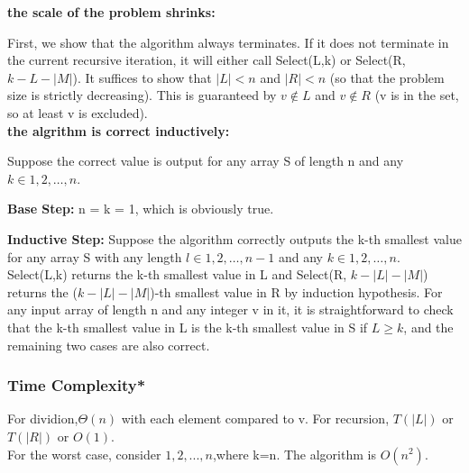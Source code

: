 \begin{prf}
\textbf{the scale of the problem shrinks:}

First, we show that the algorithm always terminates. If it does not terminate in the current recursive iteration, it will either call Select(L,k) or Select(R, $k - L - |M|$).
It suffices to show that $|L| < n$ and $|R| < n$ (so that the problem size is strictly
decreasing). This is guaranteed by $v \notin L$ and $v \notin R$ (v is in the set, so at least v is excluded).\\
\textbf{the algrithm is correct inductively:}

Suppose the correct value is output for any array S of length n and any $k \in {1,2,\ldots,n}$. 

\textbf{Base Step:} n = k = 1, which is obviously true.

\textbf{Inductive Step:} Suppose the algorithm correctly outputs the k-th smallest value for
any array S with any length $l \in {1,2,\ldots,n-1}$ and any $k \in {1,2,\ldots,n}$.\\
Select(L,k) returns the k-th smallest value in L and Select(R, $k-|L|-|M|$) returns
the ($k-|L|-|M|$)-th smallest value in R by induction hypothesis.
For any input array of length n and any integer v in it, it is straightforward to check
that the k-th smallest value in L is the k-th smallest value in S if $L \geq k$, and the
remaining two cases are also correct.
\end{prf}

\subsubsection{Time Complexity*}
For dividion,$\varTheta  (n)$ with each element compared to v. For recursion, $T(|L|)$ or $T(|R|)$ or $O(1)$.\\
For the worst case, consider ${1,2,...,n}$,where k=n. The algorithm is $O(n^2)$.

